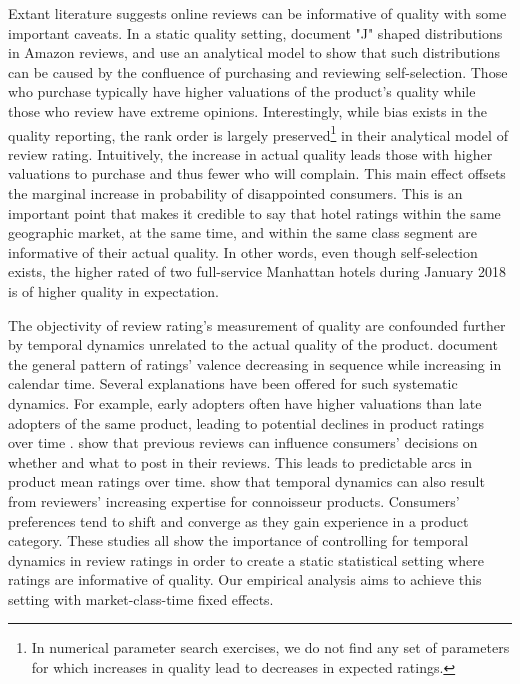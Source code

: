 \documentclass[mksc,blindrev]{informs3} %
\begin{document}
Extant literature suggests online reviews can be informative of quality with some important caveats. In a static quality setting, \citet{hu2006can} document "J" shaped distributions in Amazon reviews, and use an analytical model to show that such distributions can be caused by the confluence of purchasing and reviewing self-selection. Those who purchase typically have higher valuations of the product's quality while those who review have extreme opinions. Interestingly, while bias exists in the quality reporting, the rank order is largely preserved\footnote{In numerical parameter search exercises, we do not find any set of parameters for which increases in quality lead to decreases in expected ratings.} in their analytical model of review rating. Intuitively, the increase in actual quality leads those with higher valuations to purchase and thus fewer who will complain. This main effect offsets the marginal increase in probability of disappointed consumers. This is an important point that makes it credible to say that hotel ratings within the same geographic market, at the same time, and within the same class segment are informative of their actual quality. In other words, even though self-selection exists, the higher rated of two full-service Manhattan hotels during January 2018 is of higher quality in expectation.


The objectivity of review rating's measurement of quality are confounded further by temporal dynamics unrelated to the actual quality of the product. \citet{godes2012sequential} document the general pattern of ratings' valence decreasing in sequence while increasing in calendar time. Several explanations have been offered for such systematic dynamics. For example, early adopters often have higher valuations than late adopters of the same product, leading to potential declines in product ratings over time \citep{li2008self}. \citet{moe2012online} show that previous reviews can influence consumers' decisions on whether and what to post in their reviews. This leads to predictable arcs in product mean ratings over time. \citet{mcauley2013amateurs} show that temporal dynamics can also result from reviewers' increasing expertise for connoisseur products. Consumers' preferences tend to shift and converge as they gain experience in a product category. These studies all show the importance of controlling for temporal dynamics in review ratings in order to create a static statistical setting where ratings are informative of quality. Our empirical analysis aims to achieve this setting with market-class-time fixed effects. 
\end{document}
